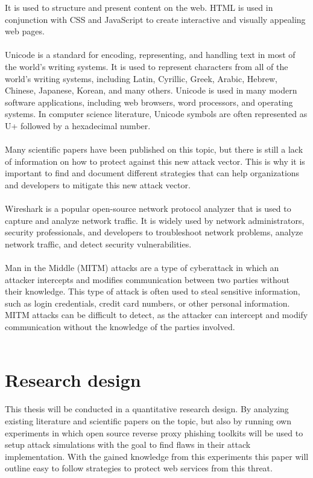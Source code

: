 \documentclass[12pt]{report}
\begin{document}
It is used to structure and present content on the web. HTML is used in conjunction
with CSS and JavaScript to create interactive and visually appealing web pages.\\ \\
Unicode is a standard for encoding, representing, and handling text in most of the
world's writing systems. It is used to represent characters from all of the world's
writing systems, including Latin, Cyrillic, Greek, Arabic, Hebrew, Chinese, Japanese,
Korean, and many others. Unicode is used in many modern software applications,
including web browsers, word processors, and operating systems. In computer science
literature, Unicode symbols are often represented as U+ followed by a hexadecimal number. \\ \\
Many scientific papers have been published on this topic, but there is still a
lack of information on how to protect against this new attack vector. This is why
it is important to find and document different strategies that can help organizations
and developers to mitigate this new attack vector. \\ \\
Wireshark is a popular open-source network protocol analyzer that is used to capture and
analyze network traffic. It is widely used by network administrators, security
professionals, and developers to troubleshoot network problems, analyze network
traffic, and detect security vulnerabilities. \\ \\
Man in the Middle (MITM) attacks are a type of cyberattack in which an attacker intercepts
and modifies communication between two parties without their knowledge. This type
of attack is often used to steal sensitive information, such as login credentials,
credit card numbers, or other personal information. MITM attacks can be difficult
to detect, as the attacker can intercept and modify communication without the
knowledge of the parties involved. \\ \\

\section{Research design}
This thesis will be conducted in a quantitative research design. By analyzing
existing literature and scientific papers on the topic, but also by running own
experiments in which open source reverse proxy phishing toolkits will be used to
setup attack simulations with the goal to find flaws in their attack implementation.
With the gained knowledge from this experiments this paper will outline easy
to follow strategies to protect web services from this threat.
\end{document}
